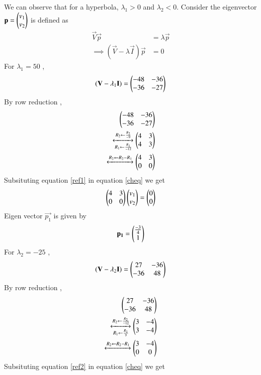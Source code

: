 \documentclass[journal,12pt,twocolumn]{IEEEtran}
\begin{document}
We can observe that for a hyperbola, $\lambda_1>0$ and  $\lambda_2<0$.
Consider the eigenvector $\mathbf{p}=\begin{pmatrix}v_1\\v_2\end{pmatrix}$ is defined as 
\begin{align}
    \vec{V}\vec{p}&=\lambda\vec{p}\\
    \implies (\vec{V}-\lambda\vec{I})\vec{p}&=0\label{cheq}
\end{align}
For $\lambda_1=50$ ,
\begin{align}
    (\mathbf{V}-\lambda_1\mathbf{I})=\begin{pmatrix}-48&-36\\-36&-27\end{pmatrix}
\end{align}
By row reduction , 
\begin{align}
    \begin{pmatrix}-48&-36\\-36&-27\end{pmatrix}\\
    \xleftrightarrow[R_1\leftarrow\frac{R_1}{-12}]{R_2\leftarrow\frac{R_2}{-9}}\begin{pmatrix}4&3\\4&3\end{pmatrix}\\
    \xleftrightarrow[]{R_2\leftarrow R_2-R_1}
    \begin{pmatrix}4&3\\0&0\end{pmatrix}\label{ref1}
\end{align}
Subsituting equation \eqref{ref1} in equation \eqref{cheq} we get
\begin{align}
        \begin{pmatrix}4&3\\0&0\end{pmatrix}\begin{pmatrix}v_1\\v_2\end{pmatrix}=\begin{pmatrix}0\\0\end{pmatrix}\label{eig1}
\end{align}
Eigen vector $\vec{p_1}$ is given by
\begin{align}
    \mathbf{p_1}=\begin{pmatrix}\frac{-3}{4}\\1\end{pmatrix}\label{ev1}
\end{align}
For $\lambda_2=-25$ ,
\begin{align}
    (\mathbf{V}-\lambda_2\mathbf{I})=\begin{pmatrix}27&-36\\-36&48\end{pmatrix}
\end{align}
By row reduction , 
\begin{align}
    \begin{pmatrix}27&-36\\-36&48\end{pmatrix}\\
    \xleftrightarrow[R_1\leftarrow\frac{R_1}{9}]
    {R_2\leftarrow\frac{R_2}{-12}}
    \begin{pmatrix}3&-4\\3&-4\end{pmatrix}\\
    \xleftrightarrow[]{R_2\leftarrow R_2-R_1}
    \begin{pmatrix}3&-4\\0&0\end{pmatrix}\label{ref2}
\end{align} 
Subsituting equation \eqref{ref2} in equation \eqref{cheq} we get 
\end{document}
